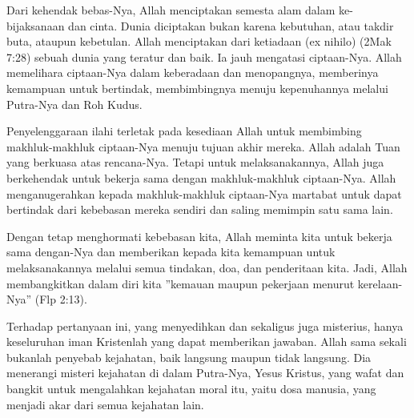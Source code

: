 \newpage
{}
\setcounter{kgkcounter}{53}
\small
{}
Dari kehendak bebas-Nya, Allah menciptakan semesta alam dalam ke-bijaksanaan dan cinta. Dunia diciptakan bukan karena kebutuhan, atau takdir
          buta, ataupun kebetulan. Allah menciptakan dari ketiadaan (ex nihilo) (2Mak
          7:28) sebuah dunia yang teratur dan baik. Ia jauh mengatasi ciptaan-Nya. Allah
          memelihara ciptaan-Nya dalam keberadaan dan menopangnya, memberinya
          kemampuan untuk bertindak, membimbingnya menuju kepenuhannya melalui
          Putra-Nya dan Roh Kudus.

Penyelenggaraan ilahi terletak pada kesediaan Allah untuk membimbing
makhluk-makhluk ciptaan-Nya menuju tujuan akhir mereka. Allah adalah Tuan
          yang berkuasa atas rencana-Nya. Tetapi untuk melaksanakannya, Allah juga
          berkehendak untuk bekerja sama dengan makhluk-makhluk ciptaan-Nya. Allah
          menganugerahkan kepada makhluk-makhluk ciptaan-Nya martabat untuk dapat
          bertindak dari kebebasan mereka sendiri dan saling memimpin satu sama lain.

    Dengan tetap menghormati kebebasan kita, Allah meminta kita untuk                
bekerja sama dengan-Nya dan memberikan kepada kita kemampuan untuk           
melaksanakannya melalui semua tindakan, doa, dan penderitaan kita. Jadi, Allah
membangkitkan dalam diri kita ”kemauan maupun pekerjaan menurut kerelaan-Nya” (Flp 2:13).

     Terhadap pertanyaan ini, yang menyedihkan dan sekaligus juga misterius,         
hanya keseluruhan iman Kristenlah yang dapat memberikan jawaban. Allah sama sekali bukanlah penyebab kejahatan, baik langsung maupun tidak langsung.
Dia menerangi misteri kejahatan di dalam Putra-Nya, Yesus Kristus, yang wafat
dan bangkit untuk mengalahkan kejahatan moral itu, yaitu dosa manusia, yang
menjadi akar dari semua kejahatan lain.


\normalsize